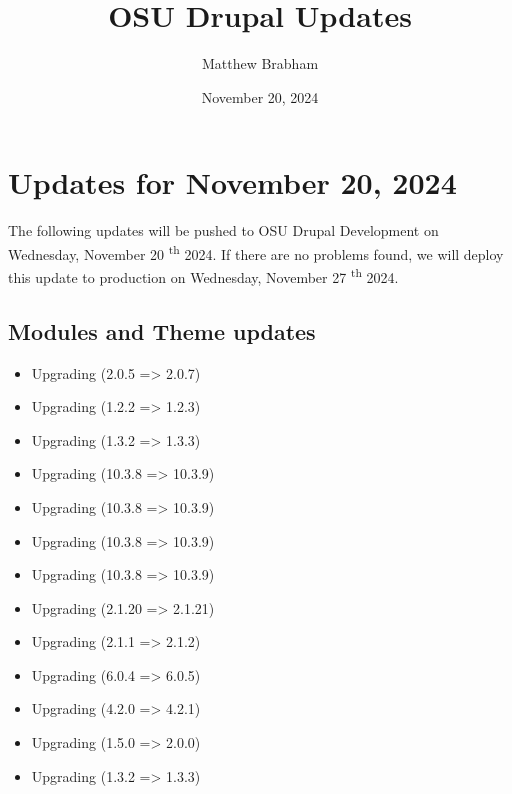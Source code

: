 
\title{OSU Drupal Updates}
\author{Matthew Brabham}
\date{November 20, 2024}

    \maketitle
    \tableofcontents


    \section{Updates for November 20, 2024}
    The following updates will be pushed to OSU Drupal Development on Wednesday, November 20 \textsuperscript{th} 2024.
    If there are no problems found, we will deploy this update to production on Wednesday, November 27 \textsuperscript{th} 2024.

    \subsection{Modules and Theme updates}

    \begin{itemize}
        \item Upgrading  (2.0.5 => 2.0.7)
        \item Upgrading  (1.2.2 => 1.2.3)
        \item Upgrading  (1.3.2 => 1.3.3)
        \item Upgrading  (10.3.8 => 10.3.9)
        \item Upgrading  (10.3.8 => 10.3.9)
        \item Upgrading  (10.3.8 => 10.3.9)
        \item Upgrading  (10.3.8 => 10.3.9)
        \item Upgrading  (2.1.20 => 2.1.21)
        \item Upgrading  (2.1.1 => 2.1.2)
        \item Upgrading  (6.0.4 => 6.0.5)
        \item Upgrading  (4.2.0 => 4.2.1)
        \item Upgrading  (1.5.0 => 2.0.0)
        \item Upgrading  (1.3.2 => 1.3.3)
    \end{itemize}

